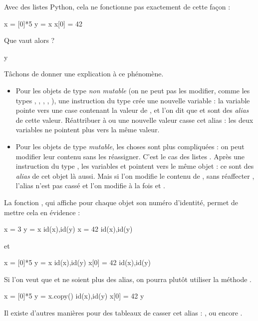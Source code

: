 Avec des listes Python, cela ne fonctionne pas exactement de cette façon : 
\begin{pyconsole}
x = [0]*5
y = x
x[0] = 42
\end{pyconsole}
Que vaut alors  ? 
\begin{pyconsole}
y
\end{pyconsole}
Tâchons de donner une explication à ce phénomène.
\begin{itemize}
  \item Pour les objets de type \emph{non mutable} (on ne peut pas les modifier, comme les types 
  , , , , ), une instruction du type  
crée une nouvelle variable : la variable  pointe vers une case contenant la valeur de 
, et l'on dit que  et  sont des \emph{alias} de cette valeur. Réattribuer à 
 ou  une nouvelle valeur casse cet alias : les deux variables ne pointent plus vers la 
même valeur.
  \item Pour les objets de type \emph{mutable}, les choses sont plus compliquées : on peut modifier 
leur contenu sans les réassigner. C'est le cas des listes \python. Après une instruction du type 
 , les variables  et  pointent vers le même objet : ce sont des 
\emph{alias} de cet objet là aussi. Mais si l'on modifie le contenu de , sans réaffecter 
, l'alias n'est pas cassé et l'on modifie à la fois  et .
\end{itemize}

La fonction , qui affiche pour chaque objet son \og numéro d'identité\fg, permet de 
mettre cela en évidence :

\begin{pyconsole}
x = 3
y = x
id(x),id(y)
x = 42
id(x),id(y)
\end{pyconsole}

et

\begin{pyconsole}
x = [0]*5
y = x
id(x),id(y)
x[0] = 42
id(x),id(y)
\end{pyconsole}

Si l'on veut que  et  ne soient plus des alias, on pourra plutôt utiliser la méthode 
.

\begin{pyconsole}
x = [0]*5
y = x.copy()
id(x),id(y)
x[0] = 42
y
\end{pyconsole}

Il existe d'autres manières pour des tableaux de casser cet alias : ,  ou encore .


